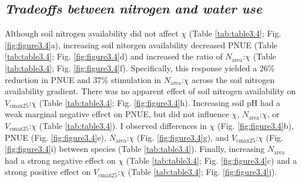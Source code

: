 \subsection{\textit{Tradeoffs between nitrogen and water use}}
\noindent Although soil nitrogen availability did not affect $\chi$ (Table \ref{tab:table3.4}; Fig. \ref{fig:figure3.4}a), increasing soil nitorgen availability decreased PNUE (Table \ref{tab:table3.4}; Fig. \ref{fig:figure3.4}d) and increased the ratio of $N_\mathrm{area}$:$\chi$ (Table \ref{tab:table3.4}; Fig. \ref{fig:figure3.4}f). Specifically, this response yielded a 26\% reduction in PNUE and 37\% stimulation in $N_\mathrm{area}$:$\chi$ across the soil nitrogen availability gradient. There was no apparent effect of soil nitrogen availability on $V_\mathrm{cmax25}$:$\chi$ (Table \ref{tab:table3.4}; Fig. \ref{fig:figure3.4}h). Increasing soil pH had a weak marginal negative effect on PNUE, but did not influence $\chi$, $N_\mathrm{area}$:$\chi$, or $V_\mathrm{cmax25}$:$\chi$ (Table \ref{tab:table3.4}). I observed differences in $\chi$ (Fig. \ref{fig:figure3.4}b), PNUE (Fig. \ref{fig:figure3.4}e), $N_\mathrm{area}$:$\chi$ (Fig. \ref{fig:figure3.4}g), and $V_\mathrm{cmax25}$:$\chi$ (Fig. \ref{fig:figure3.4}i) between species (Table \ref{tab:table3.4}). Finally, increasing $N_\mathrm{area}$ had a strong negative effect on $\chi$ (Table \ref{tab:table3.4}; Fig. \ref{fig:figure3.4}c) and a strong positive effect on $V_\mathrm{cmax25}$:$\chi$ (Table \ref{tab:table3.4}; Fig. \ref{fig:figure3.4}j).
\clearpage

